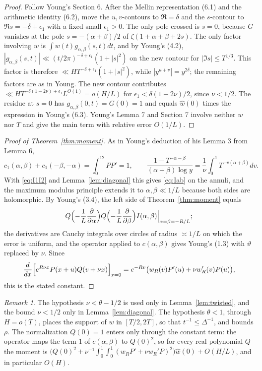 \documentclass[11pt]{article}
\theoremstyle{remark}
\newtheorem{remark}[theorem]{Remark}
\newcommand{\wh}{\widehat w(0)}
\begin{document}
\begin{proof}
Follow Young's Section 6. After the Mellin representation (6.1) and the
arithmetic identity (6.2), move the $u,v$-contours to $\Re=\delta$ and the
$s$-contour to $\Re s=-\delta+\epsilon_1$ with a fixed small $\epsilon_1>0$. The only pole crossed is $s=0$,
because $G$ vanishes at the pole $s=-(\alpha+\beta)/2$ of
$\zeta(1+\alpha+\beta+2s)$. The only factor involving $w$ is
$\int w(t)g_{\alpha,\beta}(s,t)dt$, and by Young's (4.2),
$|g_{\alpha,\beta}(s,t)|\ll(t/2\pi)^{-\delta+\epsilon_1}(1+|s|^2)$ on the new
contour for $|\Im s|\le T^{1/3}$. This factor is therefore
$\ll HT^{-\delta+\epsilon_1}(1+|s|^2)$, while $|y^{u+v}|=y^{2\delta}$; the
remaining factors are as in Young. The new contour contributes
$\ll HT^{-\delta(1-2\nu)+\epsilon_1}L^{O(1)}=o(H/L)$ for
$\epsilon_1<\delta(1-2\nu)/2$, since $\nu<1/2$. The residue at $s=0$ has
$g_{\alpha,\beta}(0,t)=G(0)=1$ and equals $\wh$ times the expression in
Young's (6.3). Young's Lemma 7 and Section 7 involve neither $w$ nor $T$ and
give the main term with relative error $O(1/L)$.
\end{proof}

\begin{proof}[Proof of Theorem~\ref{thm:moment}]
As in Young's deduction of his Lemma 3 from Lemma 6,
\[
 c_1(\alpha,\beta)+c_1(-\beta,-\alpha)=\int_0^12PP'=1,\qquad
 \frac{1-T^{-\alpha-\beta}}{(\alpha+\beta)\log y}=\frac1\nu\int_0^1T^{-v(\alpha+\beta)}dv .
\]
With \eqref{eq:I1I2} and Lemma~\ref{lem:diagonal} this gives \eqref{eq:Iab} on
the annuli, and the maximum modulus principle extends it to $\alpha,\beta\ll1/L$
because both sides are holomorphic. By Young's (3.4), the left side of
Theorem~\ref{thm:moment} equals
\[
 Q\Bigl(-\frac1L\frac{\partial}{\partial\alpha}\Bigr)
 Q\Bigl(-\frac1L\frac{\partial}{\partial\beta}\Bigr)I(\alpha,\beta)
 \Big|_{\alpha=\beta=-R/L};
\]
the derivatives are Cauchy integrals over circles of radius $\asymp1/L$ on
which the error is uniform, and the operator applied to $c(\alpha,\beta)$ gives
Young's (1.3) with $\vartheta$ replaced by $\nu$. Since
\[
 \frac{d}{dx}\Bigl[e^{R\nu x}P(x+u)Q(v+\nu x)\Bigr]_{x=0}
 =e^{-Rv}\bigl(w_R(v)P'(u)+\nu w_R'(v)P(u)\bigr),
\]
this is the stated constant.
\end{proof}

\begin{remark}\label{rem:uses}
The hypothesis $\nu<\theta-1/2$ is used only in Lemma~\ref{lem:twisted}, and
the bound $\nu<1/2$ only in Lemma~\ref{lem:diagonal}. The hypothesis
$\theta<1$, through $H=o(T)$, places the support of $w$ in $[T/2,2T]$, so that
$t^{-1}\le\Delta^{-1}$, and bounds $\rho$. The normalization $Q(0)=1$ enters
only through the constant term: the operator maps the term $1$ of
$c(\alpha,\beta)$ to $Q(0)^2$, so for every real polynomial $Q$ the moment is
$\bigl(Q(0)^2+\nu^{-1}\int_0^1\!\int_0^1(w_RP'+\nu w_R'P)^2\bigr)\wh+O(H/L)$,
and in particular $O(H)$.
\end{remark}
\end{document}
